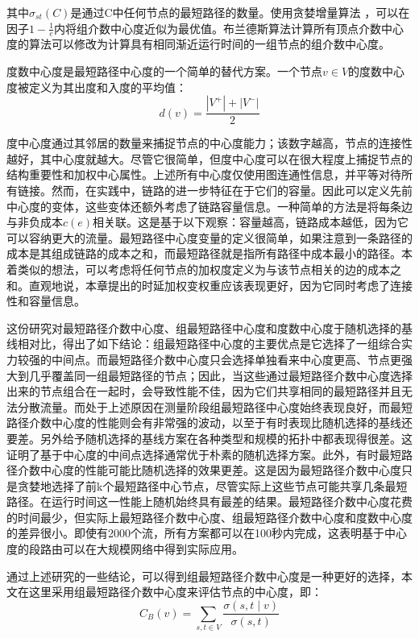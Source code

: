 其中$\sigma_{st}\left(C\right)$是通过C中任何节点的最短路径的数量。使用贪婪增量算法 \cite{SRXXXX3} ，可以在因子$1-\frac{1}{e}$内将组介数中心度近似为最优值。布兰德斯算法计算所有顶点介数中心度的算法可以修改为计算具有相同渐近运行时间的一组节点的组介数中心度。

度数中心度是最短路径中心度的一个简单的替代方案。一个节点$v \in V$的度数中心度被定义为其出度和入度的平均值：
$$d(v)=\frac{|V^+|+|V^-|}{2}$$

度中心度通过其邻居的数量来捕捉节点的中心度能力；该数字越高，节点的连接性越好，其中心度就越大。尽管它很简单，但度中心度可以在很大程度上捕捉节点的结构重要性和加权中心属性。上述所有中心度仅使用图连通性信息，并平等对待所有链接。然而，在实践中，链路的进一步特征在于它们的容量。因此可以定义先前中心度的变体，这些变体还额外考虑了链路容量信息。一种简单的方法是将每条边与非负成本$c(e)$相关联。这是基于以下观察：容量越高，链路成本越低，因为它可以容纳更大的流量。最短路径中心度变量的定义很简单，如果注意到一条路径的成本是其组成链路的成本之和，而最短路径就是指所有路径中成本最小的路径。本着类似的想法，可以考虑将任何节点的加权度定义为与该节点相关的边的成本之和。直观地说，本章提出的时延加权变权重应该表现更好，因为它同时考虑了连接性和容量信息。

这份研究对最短路径介数中心度、组最短路径中心度和度数中心度于随机选择的基线相对比，得出了如下结论：组最短路径中心度的主要优点是它选择了一组综合实力较强的中间点。而最短路径介数中心度只会选择单独看来中心度更高、节点更强大到几乎覆盖同一组最短路径的节点；因此，当这些通过最短路径介数中心度选择出来的节点组合在一起时，会导致性能不佳，因为它们共享相同的最短路径并且无法分散流量。而处于上述原因在测量阶段组最短路径中心度始终表现良好，而最短路径介数中心度的性能则会有非常强的波动，以至于有时表现比随机选择的基线还要差。另外给予随机选择的基线方案在各种类型和规模的拓扑中都表现得很差。这证明了基于中心度的中间点选择通常优于朴素的随机选择方案。此外，有时最短路径介数中心度的性能可能比随机选择的效果更差。这是因为最短路径介数中心度只是贪婪地选择了前k个最短路径中心节点，尽管实际上这些节点可能共享几条最短路径。在运行时间这一性能上随机始终具有最差的结果。最短路径介数中心度花费的时间最少，但实际上最短路径介数中心度、组最短路径介数中心度和度数中心度的差异很小。即使有2000个流，所有方案都可以在100秒内完成，这表明基于中心度的段路由可以在大规模网络中得到实际应用。

通过上述研究的一些结论，可以得到组最短路径介数中心度是一种更好的选择，本文在这里采用组最短路径介数中心度来评估节点的中心度，即：
$$C_B\left(v\right)=\sum_{s,t\in V}\frac{\sigma\left(s,t\middle| v\right)}{\sigma(s,t)}$$

